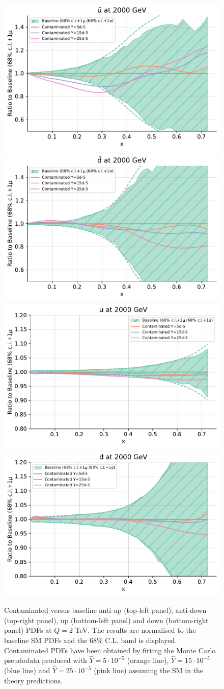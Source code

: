 \documentclass[withindex,glossary]{cam-thesis}
\begin{document}
\begin{figure}[H]
  \includegraphics[width=0.49\linewidth]{Figures/ubar_cont_y_2tev.pdf}
  \includegraphics[width=0.49\linewidth]{Figures/dbar_cont_y_2tev.pdf}
  \includegraphics[width=0.49\linewidth]{Figures/u_cont_y_2tev.pdf}
  \includegraphics[width=0.49\linewidth]{Figures/d_cont_y_2tev.pdf}
  \caption{Contaminated versus baseline anti-up (top-left panel), anti-down (top-right panel), up (bottom-left panel) and down (bottom-right panel) PDFs at
    $Q=2$ TeV. The results are normalised to the baseline SM PDFs and
    the 68\% C.L. band is displayed. Contaminated PDFs have been
    obtained by fitting the Monte Carlo pseudodata
    produced with $\hat{Y}=5\cdot 10^{-5}$ (orange line),
    $\hat{Y}=15\cdot 10^{-5}$ (blue line) and $\hat{Y}=25\cdot
    10^{-5}$ (pink line) assuming the SM in the theory predictions. }
	\label{fig:Ypdfs}
      \end{figure}
\end{document}

